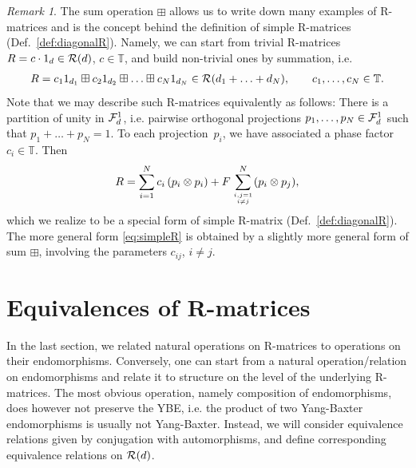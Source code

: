 \documentclass[12pt,a4paper]{amsart}
\numberwithin{equation}{section}
\theoremstyle{remark}
\newtheorem{remark}[theorem]{Remark}
\newcommand{\ot}{\otimes}
\def\T{\mathbb{T}}
\begin{document}
\begin{remark}
    The sum operation $\boxplus$ allows us to write down many examples of R-matrices and is the concept behind the definition of simple R-matrices (Def.~\ref{def:diagonalR}). Namely, we can start from trivial R-matrices $R=c\cdot1_d\in\mathcal{R}(d)$, $c\in\T$, and build non-trivial ones by summation, i.e.
    \begin{align*}
        R=c_11_{d_1}\boxplus c_21_{d_2}\boxplus\ldots\boxplus c_N1_{d_N}\in\CR(d_1+\ldots+d_N),\qquad c_1,\ldots,c_N\in\T.
    \end{align*}
    Note that we may describe such R-matrices equivalently as follows: There is a partition of unity in $\mathcal{F}_d^1$, i.e. pairwise orthogonal projections $p_1,\ldots,p_N\in\mathcal{F}_d^1$ such that $p_1+\ldots+p_N=1$. To each projection~$p_i$, we have associated a phase factor $c_i\in\T$. Then 
    \begin{align}\label{eq:easyR}
        R=\sum_{i=1}^N c_i\,(p_i\ot p_i)+ F\sum_{\genfrac{}{}{0pt}{2}{i,j=1}{i\neq j}}^N (p_i\ot p_j),
    \end{align}
    which we realize to be a special form of simple R-matrix (Def.~\ref{def:diagonalR}). The more general form \eqref{eq:simpleR} is obtained by a slightly more general form of sum $\boxplus$, involving the parameters $c_{ij}$, $i\neq j$.
\end{remark}



\section{Equivalences of R-matrices}\label{section:equivalence}

In the last section, we related natural operations on R-matrices to operations on their endomorphisms. Conversely, one can start from a natural operation/relation on endomorphisms and relate it to structure on the level of the underlying R-matrices. The most obvious operation, namely composition of endomorphisms, does however not preserve the YBE, i.e. the product of two Yang-Baxter endomorphisms is usually not Yang-Baxter. Instead, we will consider equivalence relations given by conjugation with automorphisms, and define corresponding equivalence relations on $\mathcal{R}(d)$.
\end{document}
